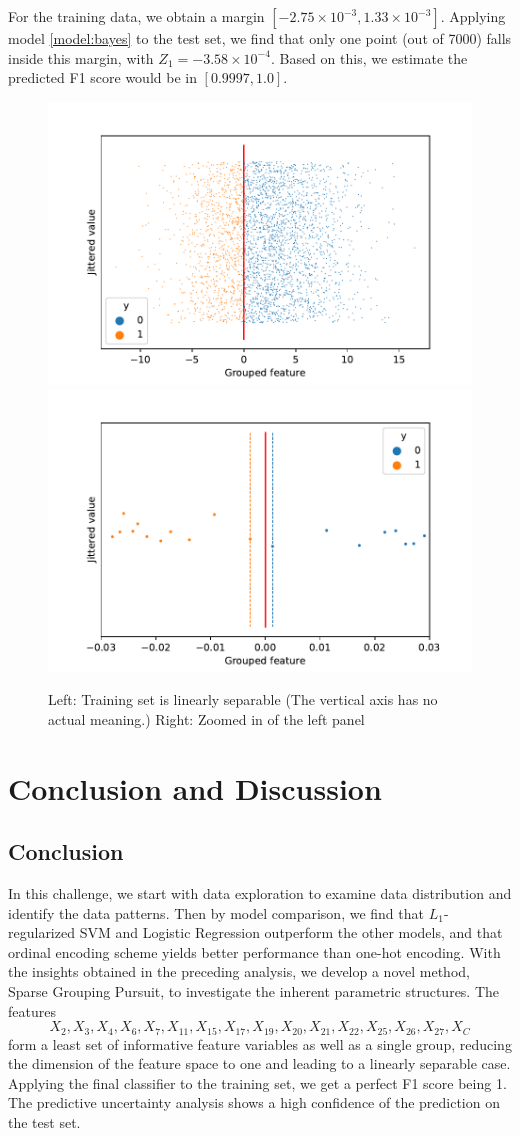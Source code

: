 \documentclass[11pt]{article}
\begin{document}
For the training data, we obtain a margin $[-2.75\times 10^{-3}, 1.33 \times 10^{-3}]$. Applying model \eqref{model:bayes} to the test set, we find that only one point (out of 7000) falls inside this margin, with $Z_1 = -3.58 \times 10^{-4}$. 
Based on this, we estimate the predicted F1 score would be in $[0.9997, 1.0]$.

\begin{figure}[H]
    \centering
    \includegraphics[width=.49\linewidth]{Bayesorigin.pdf}
    \includegraphics[width=.49\linewidth]{Bayeszoomin.pdf}
   \caption{Left: Training set is linearly separable (The vertical axis has no actual meaning.) Right: Zoomed in of the left panel}    \label{fig:Bayes}
\end{figure}

\section{Conclusion and Discussion}

\subsection{Conclusion}

In this challenge, we start with data exploration to examine  data distribution and identify the data patterns. Then by model comparison, we find that $L_1$-regularized SVM and Logistic Regression outperform the other models, and that ordinal encoding scheme yields better performance than one-hot encoding. With the insights obtained in the preceding analysis, we develop a novel method, Sparse Grouping Pursuit, to investigate the inherent parametric structures. The features
\begin{equation*}
    X_2,X_3,X_4,X_6,X_7,X_{11},X_{15},X_{17},X_{19},X_{20},X_{21},X_{22},X_{25},X_{26},X_{27},X_C
\end{equation*}
form a least set of informative feature variables as well as a single group, reducing the dimension of the feature space to one and leading to a linearly separable case. Applying the final classifier to the training set, we get a perfect F1 score being 1. The predictive uncertainty analysis shows a high confidence of the prediction on the test set.
\end{document}
